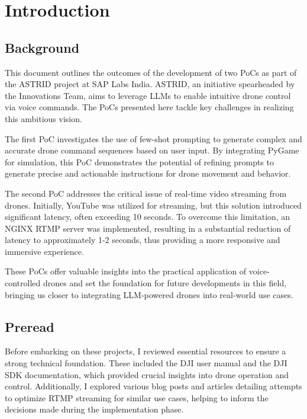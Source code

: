 \chapter{Introduction}
\label{introduction}
\nocite{*}

\section{Background}
This document outlines the outcomes of the development of two \acp{PoC} as part of the \ac{ASTRID} project at SAP Labs India. \ac{ASTRID}, an initiative spearheaded by the Innovations Team, 
aims to leverage \acp{LLM} to enable intuitive drone control via voice commands. The \acp{PoC} presented here tackle key challenges in realizing this ambitious vision.

The first \ac{PoC} investigates the use of few-shot prompting to generate complex and accurate drone command sequences based on user input. 
By integrating PyGame for simulation, this \ac{PoC} demonstrates the potential of refining prompts to generate precise and actionable instructions for drone movement and behavior.

The second \ac{PoC} addresses the critical issue of real-time video streaming from drones. Initially, YouTube was utilized for streaming, but this solution introduced significant latency, often exceeding 10 seconds. 
To overcome this limitation, an NGINX \ac{RTMP} server was implemented, resulting in a substantial reduction of latency to approximately 1-2 seconds, thus providing a more responsive and immersive experience.

These \acp{PoC} offer valuable insights into the practical application of voice-controlled drones and set the foundation for future developments in this field, 
bringing us closer to integrating \ac{LLM}-powered drones into real-world use cases.

\section{Preread}
Before embarking on these projects, I reviewed essential resources to ensure a strong technical foundation. These included the DJI user manual and the DJI SDK documentation, 
which provided crucial insights into drone operation and control. Additionally, I explored various blog posts and articles detailing attempts to optimize \ac{RTMP} streaming for similar use cases, 
helping to inform the decisions made during the implementation phase.